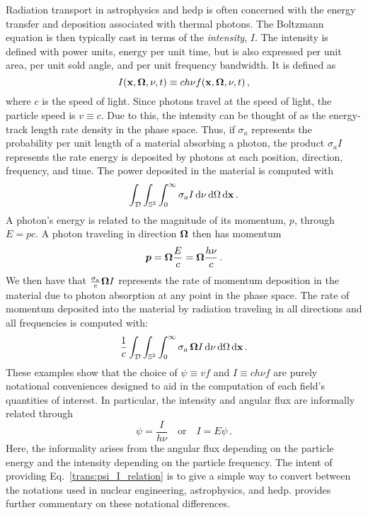 \documentclass[../doc.tex]{subfiles}
\begin{document}
Radiation transport in astrophysics and \gls{hedp} is often concerned with the energy transfer and deposition associated with thermal photons. The Boltzmann equation is then typically cast in terms of the \emph{intensity}, $I$. The intensity is defined with power units, energy per unit time, but is also expressed per unit area, per unit sold angle, and per unit frequency bandwidth. It is defined as 
	\begin{equation}
		I(\boldsymbol{\mathrm{x}},\boldsymbol{\Omega},\nu,t) \equiv c h \nu f(\boldsymbol{\mathrm{x}},\boldsymbol{\Omega},\nu,t) \,,
	\end{equation}
where $c$ is the speed of light. 
Since photons travel at the speed of light, the particle speed is $v \equiv c$. 
Due to this, the intensity can be thought of as the energy-track length rate density in the phase space.
Thus, if $\sigma_a$ represents the probability per unit length of a material absorbing a photon, the product $\sigma_a I$ represents the rate energy is deposited by photons at each position, direction, frequency, and time. 
The power deposited in the material is computed with 
	\begin{equation}
		\int_{\mathcal{D}} \int_{\mathbb{S}^2} \int_0^\infty \sigma_a I \mathop{}\!\mathrm{d} \nu \mathop{}\!\mathrm{d}\Omega \mathop{}\!\mathrm{d} \boldsymbol{\mathrm{x}} \,. 
	\end{equation}
A photon's energy is related to the magnitude of its momentum, $p$, through $E = p c$. A photon traveling in direction $\boldsymbol{\Omega}$ then has momentum 
	\begin{equation}
		\boldsymbol{p} = \boldsymbol{\Omega} \frac{E}{c} = \boldsymbol{\Omega} \frac{h \nu}{c} \,. 
	\end{equation}
We then have that $\frac{\sigma_a}{c}\boldsymbol{\Omega} I$ represents the rate of momentum deposition in the material due to photon absorption at any point in the phase space. 
The rate of momentum deposited into the material by radiation traveling in all directions and all frequencies is computed with:  
	\begin{equation}
		\frac{1}{c}\int_{\mathcal{D}} \int_{\mathbb{S}^2} \int_0^\infty \sigma_a\,\boldsymbol{\Omega} I \mathop{}\!\mathrm{d} \nu \mathop{}\!\mathrm{d} \Omega\mathop{}\!\mathrm{d} \boldsymbol{\mathrm{x}} \,. 
	\end{equation}
These examples show that the choice of $\psi \equiv vf$ and $I \equiv c h\nu f$ are purely notational conveniences designed to aid in the computation of each field's quantities of interest. 
In particular, the intensity and angular flux are informally related through 
	\begin{equation} \label{trans:psi_I_relation}
		\psi = \frac{I}{h\nu} \quad \mathrm{or} \quad I = E \psi \,. 
	\end{equation}
Here, the informality arises from the angular flux depending on the particle energy and the intensity depending on the particle frequency. The intent of providing Eq.~\ref{trans:psi_I_relation} is to give a simple way to convert between the notations used in nuclear engineering, astrophysics, and \gls{hedp}. 
\textcite[\S 2.1.5]{rgm} provides further commentary on these notational differences. 
\end{document}
